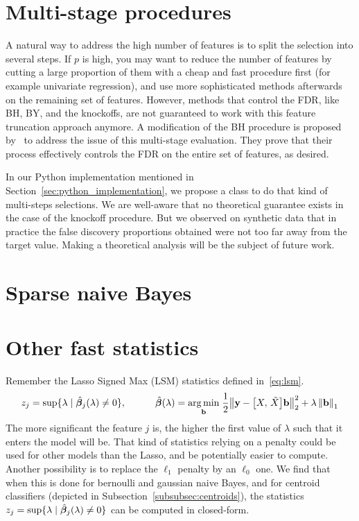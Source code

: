 \section{Multi-stage procedures}\label{sec:multi_stage}

A natural way to address the high number of features is to split the selection into several steps.
If $p$ is high,
you may want to reduce the number of features by cutting
a large proportion of them with a cheap and fast procedure first
(for example univariate regression),
and use more sophisticated methods afterwards on the remaining set of features.
However, methods that control the FDR, like BH, BY, and the knockoffs, are not guaranteed to work with this
feature truncation approach anymore.
A modification of the BH procedure is proposed by~\cite{multi_stage_fdr}
to address the issue of this multi-stage evaluation.
They prove that their process effectively controls the FDR on the entire set of features, as desired.

In our Python implementation mentioned in Section~\ref{sec:python_implementation},
we propose a  class to do that kind of multi-steps selections.
We are well-aware that no theoretical guarantee exists in the case of the knockoff procedure.
But we observed on synthetic data that in practice the false discovery proportions obtained
were not too far away from the target value.
Making a theoretical analysis will be the subject of future work.

\section{Sparse naive Bayes}\label{sec:snb}



\section{Other fast statistics}\label{sec:a}

Remember the Lasso Signed Max (LSM) statistics defined in~\ref{eq:lsm}.
\begin{equation}\label{eq:lsm}
    z_j = \sup\{\lambda \mid \hat{\bm{\beta}}_j(\lambda) \neq 0\}
    ,\qquad\quad
    \hat{\bm{\beta}}(\lambda) =
        \underset{\mathbf{b}}{\operatorname*{arg\,min}}\;
        \frac{1}{2}\big\lVert \mathbf{y} - \big[ X,\, \tilde{X} \big]\mathbf{b} \big\rVert_2^2 + \lambda\left\lVert\mathbf{b}\right\rVert_1
\end{equation}
The more significant the feature $j$ is,
the higher the first value of $\lambda$ such that it enters the model will be.
That kind of statistics relying on a penalty could be used for other models than the Lasso,
and be potentially easier to compute.
Another possibility is to replace the $\ell_1$ penalty by an $\ell_0$ one.
We find that when this is done for bernoulli and gaussian naive Bayes,
and for centroid classifiers (depicted in Subsection~\ref{subsubsec:centroids}),
the statistics $z_j = \sup\{\lambda \mid \hat{\bm{\beta}}_j(\lambda) \neq 0\}$
can be computed in closed-form.

